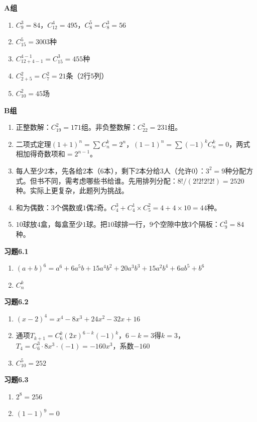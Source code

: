 \textbf{A组}
\begin{enumerate}
\item $C_9^3=84$，$C_{12}^4=495$，$C_8^5=C_8^3=56$
\item $C_{15}^5=3003$种
\item $C_{12+4-1}^{4-1}=C_{15}^3=455$种
\item $C_{2+5}^2=C_7^2=21$条（$2$行$5$列）
\item $C_{10}^2=45$场
\end{enumerate}

\textbf{B组}
\begin{enumerate}
\item 正整数解：$C_{19}^2=171$组。非负整数解：$C_{22}^2=231$组。
\item 二项式定理$(1+1)^n=\sum C_n^k=2^n$，$(1-1)^n=\sum(-1)^kC_n^k=0$，两式相加得奇数项和$=2^{n-1}$。
\item 每人至少$2$本，先各给$2$本（$6$本），剩下$2$本分给$3$人（允许$0$）：$3^2=9$种分配方式。但书不同，需考虑哪些书给谁。先用排列分配：$8!/(2!2!2!2!)=2520$种。实际上更复杂，此题列为挑战。
\item 和为偶数：$3$个偶数或$1$偶$2$奇。$C_4^3+C_4^1\times C_5^2=4+4\times10=44$种。
\item $10$球放$4$盒，每盒至少$1$球。把$10$球排一行，$9$个空隙中放$3$个隔板：$C_9^3=84$种。
\end{enumerate}


\textbf{习题6.1}
\begin{enumerate}
\item $(a+b)^6=a^6+6a^5b+15a^4b^2+20a^3b^3+15a^2b^4+6ab^5+b^6$
\item $C_n^k$
\end{enumerate}

\textbf{习题6.2}
\begin{enumerate}
\item $(x-2)^4=x^4-8x^3+24x^2-32x+16$
\item 通项$T_{k+1}=C_6^k(2x)^{6-k}(-1)^k$，$6-k=3$得$k=3$，$T_4=C_6^3\cdot8x^3\cdot(-1)=-160x^3$，系数$-160$
\item $C_{10}^5=252$
\end{enumerate}

\textbf{习题6.3}
\begin{enumerate}
\item $2^8=256$
\item $(1-1)^9=0$
\end{enumerate}

